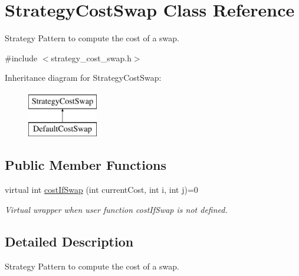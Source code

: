 \hypertarget{classStrategyCostSwap}{\section{\-Strategy\-Cost\-Swap \-Class \-Reference}
\label{classStrategyCostSwap}
}


\-Strategy \-Pattern to compute the cost of a swap.  




{\ttfamily \#include $<$strategy\-\_\-cost\-\_\-swap.\-h$>$}

\-Inheritance diagram for \-Strategy\-Cost\-Swap\-:\begin{figure}[H]
\begin{center}
\leavevmode
\includegraphics[height=2.000000cm]{classStrategyCostSwap}
\end{center}
\end{figure}
\subsection*{\-Public \-Member \-Functions}
\begin{DoxyCompactItemize}
\item 
virtual int \hyperlink{classStrategyCostSwap_a154e8db5c0e7cc22bd33942bbe4b8618}{cost\-If\-Swap} (int current\-Cost, int i, int j)=0
\begin{DoxyCompactList}\small\item\em \-Virtual wrapper when user function cost\-If\-Swap is not defined. \end{DoxyCompactList}\end{DoxyCompactItemize}


\subsection{\-Detailed \-Description}
\-Strategy \-Pattern to compute the cost of a swap. 

